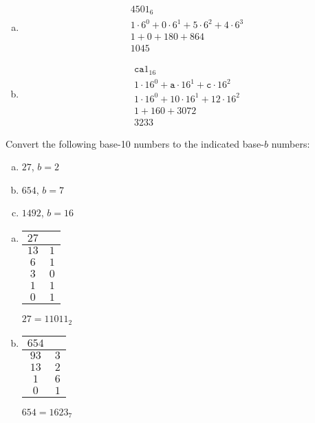 \documentclass[12pt,letterpaper]{exam}
\begin{document}
\begin{questions}
\begin{enumerate}[(a)]
\item 
	\[
	\begin{gathered}
	4501_6 \\[0.2cm]
	1 \cdot 6^0 + 0 \cdot 6^1 + 5 \cdot 6^2 + 4 \cdot 6^3 \\[0.2cm]
	1 + 0 + 180 + 864 \\[0.2cm]
	1045
	\end{gathered}
	\] \pspace

\item 
	\[
	\begin{gathered}
	\texttt{ca}1_{16} \\[0.2cm]
	1 \cdot 16^0 + \texttt{a} \cdot 16^1 + \texttt{c} \cdot 16^2 \\[0.2cm]
	1 \cdot 16^0 + 10 \cdot 16^1 + 12 \cdot 16^2 \\[0.2cm]
	1 + 160 + 3072 \\[0.2cm]
	3233
	\end{gathered}
	\]
\end{enumerate}



\newpage
\question[10] Convert the following base-10 numbers to the indicated base-$b$ numbers:
	\begin{enumerate}[(a)]
	\item $27$, $b= 2$
	\item $654$, $b= 7$
	\item $1492$, $b= 16$
	\end{enumerate} \pspace

\sol 
\begin{enumerate}[(a)]
\item \phantom{.}\par
	\begin{table}[h]
	\centering
	\begin{tabular}{c|c}
	$27$ & \cellcolor[HTML]{9B9B9B} \\ \hline
	$13$ & $1$ \\
	$6$ & $1$ \\
	$3$ & $0$ \\
	$1$ & $1$ \\
	$0$ & $1$ 
	\end{tabular} \pvspace{0.75cm}
	$27= 11011_2$
	\end{table} \pspace

\item \phantom{.}\par
	\begin{table}[h]
	\centering
	\begin{tabular}{c|c}
	$654$ & \cellcolor[HTML]{9B9B9B} \\ \hline
	$93$ & $3$ \\
	$13$ & $2$ \\
	$1$ & $6$ \\
	$0$ & $1$ 
	\end{tabular} \pvspace{0.75cm}
	$654= 1623_7$
	\end{table} \pspace
 

\end{enumerate}
\end{questions}
\end{document}
